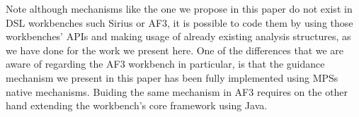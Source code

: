 Note although mechanisms like the one we propose in this paper do not exist in
DSL workbenches such Sirius or AF3, it is possible to code them by using those
workbenches' APIs and making usage of already existing analysis structures, as
we have done for the work we present here. One of the differences that we are
aware of regarding the AF3 workbench in particular, is that the guidance
mechanism we present in this paper has been fully implemented using MPSs native
mechanisms. Buiding the same mechanism in AF3 requires on the other hand
extending the workbench's core framework using Java.



